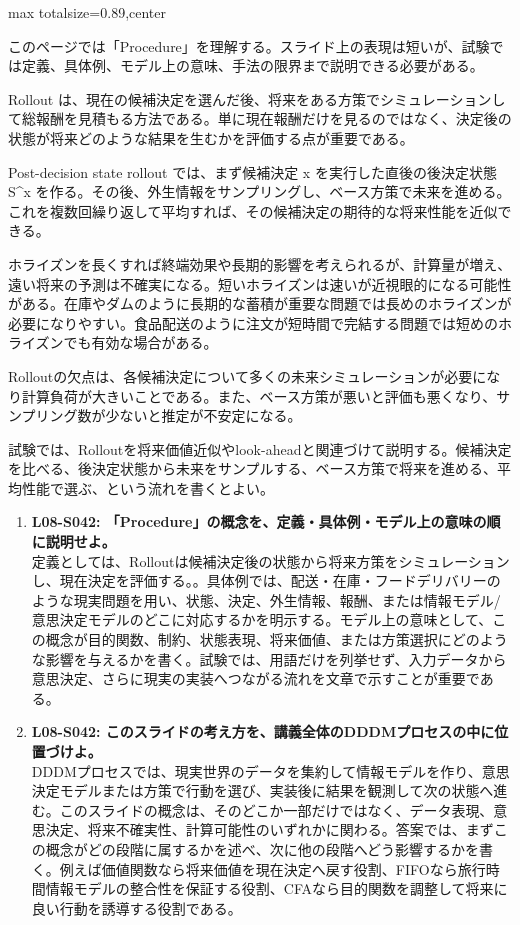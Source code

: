 \begin{minipage}[t]{0.58\textwidth}
\begin{adjustbox}{max totalsize={\textwidth}{0.89\textheight},center}
\begin{minipage}{\textwidth}\scriptsize
{}このページでは「Procedure」を理解する。スライド上の表現は短いが、試験では定義、具体例、モデル上の意味、手法の限界まで説明できる必要がある。\par
Rollout は、現在の候補決定を選んだ後、将来をある方策でシミュレーションして総報酬を見積もる方法である。単に現在報酬だけを見るのではなく、決定後の状態が将来どのような結果を生むかを評価する点が重要である。\par
Post-decision state rollout では、まず候補決定 x を実行した直後の後決定状態 S\textasciicircum{}x を作る。その後、外生情報をサンプリングし、ベース方策で未来を進める。これを複数回繰り返して平均すれば、その候補決定の期待的な将来性能を近似できる。\par
ホライズンを長くすれば終端効果や長期的影響を考えられるが、計算量が増え、遠い将来の予測は不確実になる。短いホライズンは速いが近視眼的になる可能性がある。在庫やダムのように長期的な蓄積が重要な問題では長めのホライズンが必要になりやすい。食品配送のように注文が短時間で完結する問題では短めのホライズンでも有効な場合がある。\par
Rolloutの欠点は、各候補決定について多くの未来シミュレーションが必要になり計算負荷が大きいことである。また、ベース方策が悪いと評価も悪くなり、サンプリング数が少ないと推定が不安定になる。\par
試験では、Rolloutを将来価値近似やlook-aheadと関連づけて説明する。候補決定を比べる、後決定状態から未来をサンプルする、ベース方策で将来を進める、平均性能で選ぶ、という流れを書くとよい。\par{}\begin{enumerate}\item \textbf{L08-S042: 「Procedure」の概念を、定義・具体例・モデル上の意味の順に説明せよ。}\\定義としては、Rolloutは候補決定後の状態から将来方策をシミュレーションし、現在決定を評価する。。具体例では、配送・在庫・フードデリバリーのような現実問題を用い、状態、決定、外生情報、報酬、または情報モデル/意思決定モデルのどこに対応するかを明示する。モデル上の意味として、この概念が目的関数、制約、状態表現、将来価値、または方策選択にどのような影響を与えるかを書く。試験では、用語だけを列挙せず、入力データから意思決定、さらに現実の実装へつながる流れを文章で示すことが重要である。\item \textbf{L08-S042: このスライドの考え方を、講義全体のDDDMプロセスの中に位置づけよ。}\\DDDMプロセスでは、現実世界のデータを集約して情報モデルを作り、意思決定モデルまたは方策で行動を選び、実装後に結果を観測して次の状態へ進む。このスライドの概念は、そのどこか一部だけではなく、データ表現、意思決定、将来不確実性、計算可能性のいずれかに関わる。答案では、まずこの概念がどの段階に属するかを述べ、次に他の段階へどう影響するかを書く。例えば価値関数なら将来価値を現在決定へ戻す役割、FIFOなら旅行時間情報モデルの整合性を保証する役割、CFAなら目的関数を調整して将来に良い行動を誘導する役割である。\end{enumerate}

\end{minipage}
\end{adjustbox}
\end{minipage}
